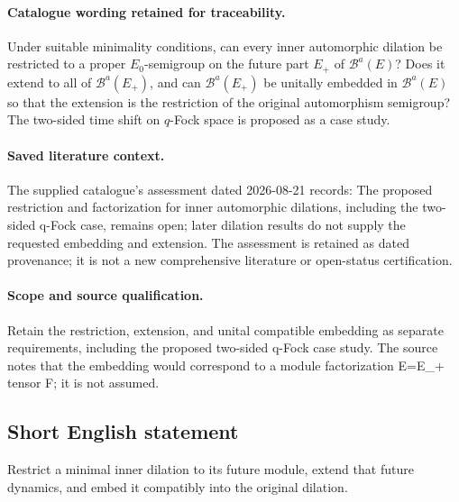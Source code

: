 \documentclass[11pt]{article}
\begin{document}
\paragraph{Catalogue wording retained for traceability.}
Under suitable minimality conditions, can every inner automorphic dilation be restricted to a proper $E_0$-semigroup on the future part $E_+$ of $\mathcal B^a(E)$? Does it extend to all of $\mathcal B^a(E_+)$, and can $\mathcal B^a(E_+)$ be unitally embedded in $\mathcal B^a(E)$ so that the extension is the restriction of the original automorphism semigroup? The two-sided time shift on $q$-Fock space is proposed as a case study.

\paragraph{Saved literature context.} The supplied catalogue's assessment dated 2026-08-21 records: The proposed restriction and factorization for inner automorphic dilations, including the two-sided q-Fock case, remains open; later dilation results do not supply the requested embedding and extension. The assessment is retained as dated provenance; it is not a new comprehensive literature or open-status certification.
\paragraph{Scope and source qualification.}Retain the restriction, extension, and unital compatible embedding as separate requirements, including the proposed two-sided q-Fock case study. The source notes that the embedding would correspond to a module factorization E=E_+ tensor F; it is not assumed.
\subsection{Short English statement}
Restrict a minimal inner dilation to its future module, extend that future dynamics, and embed it compatibly into the original dilation.
\end{document}
